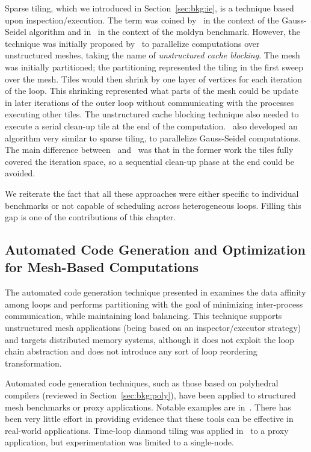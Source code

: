 Sparse tiling, which we introduced in Section~\ref{sec:bkg:ie}, is a technique based upon inspection/execution. The term was coined by~\cite{ST-StroutLCPC2002,ST-StroutIJHPCA} in the context of the Gauss-Seidel algorithm and in~\cite{ST-StroutPLDI03} in the context of the moldyn benchmark. However, the technique was initially proposed by~\cite{ST-dimeEtna00} to parallelize computations over unstructured meshes, taking the name of \textit{unstructured cache blocking}. The mesh was initially partitioned; the partitioning represented the tiling in the first sweep over the mesh. Tiles would then shrink by one layer of vertices for each iteration of the loop. This shrinking represented what parts of the mesh could be update in later iterations of the outer loop without communicating with the processes executing other tiles. The unstructured cache blocking technique also needed to execute a serial clean-up tile at the end of the computation.~\cite{ST-Adams99c} also developed an algorithm very similar to sparse tiling, to parallelize Gauss-Seidel computations. The main difference between~\cite{ST-StroutLCPC2002,ST-StroutIJHPCA} and~\cite{ST-dimeEtna00} was that in the former work the tiles fully covered the iteration space, so a sequential clean-up phase at the end could be avoided. 

We reiterate the fact that all these approaches were either specific to individual benchmarks or not capable of scheduling across heterogeneous loops. Filling this gap is one of the contributions of this chapter.

\subsection*{Automated Code Generation and Optimization for Mesh-Based Computations}
The automated code generation technique presented in \cite{ST-OhioStateMPICodeGen} examines the data affinity among loops and performs partitioning with the goal of minimizing inter-process communication, while maintaining load balancing. This technique supports unstructured mesh applications (being based on an inspector/executor strategy) and targets distributed memory systems, although it does not exploit the loop chain abstraction and does not introduce any sort of loop reordering transformation.

Automated code generation techniques, such as those based on polyhedral compilers (reviewed in Section~\ref{sec:bkg:poly}), have been applied to structured mesh benchmarks or proxy applications. Notable examples are in~\cite{pluto,polly,loopy}. There has been very little effort in providing evidence that these tools can be effective in real-world applications. Time-loop diamond tiling was applied in~\cite{cohen-timetiling} to a proxy application, but experimentation was limited to a single-node.


